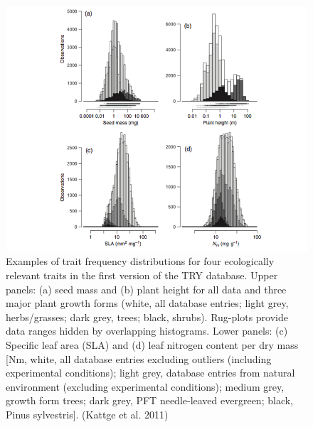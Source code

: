 \documentclass[12pt,oneside]{book}
\begin{document}
\begin{figure}

{\centering \includegraphics[width=0.8\linewidth]{figures/chap7/f710_try_distr} 

}

\caption{Examples of trait frequency distributions for four ecologically relevant traits in the first version of the TRY database. Upper panels: (a) seed mass and (b) plant height for all data and three major plant growth forms (white, all database entries; light grey, herbs/grasses; dark grey, trees; black, shrubs). Rug-plots provide data ranges hidden by overlapping histograms. Lower panels: (c) Specific leaf area (SLA) and (d) leaf nitrogen content per dry mass [Nm, white, all database entries excluding outliers (including experimental conditions); light grey, database entries from natural environment (excluding experimental conditions); medium grey, growth form trees; dark grey, PFT needle-leaved evergreen; black, Pinus sylvestris]. (Kattge et al. 2011)}\label{fig:f710}
\end{figure}
\end{document}
